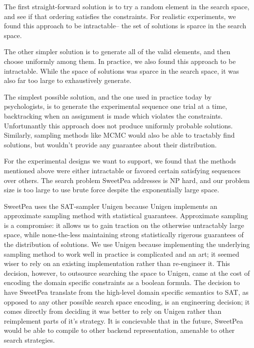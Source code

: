 The first straight-forward solution is to try a random element in the search space, and see if that ordering satisfies the constraints. For realistic experiments, we found this approach to be intractable-- the set of solutions is sparce in the search space.

The other simpler solution is to generate all of the valid elements, and then choose uniformly among them. In practice, we also found this approach to be intractable. While the space of solutions was sparce in the search space, it was also far too large to exhaustively generate.

The simplest possible solution, and the one used in practice today by psychologists, is to generate the experimental sequence one trial at a time, backtracking when an assignment is made which violates the constraints. Unfortunantly this approach does not produce uniformly probable solutions. Similarly, sampling methods like MCMC would also be able to tractably find solutions, but wouldn't provide any guarantee about their distribution.

For the experimental designs we want to support, we found that the methods mentioned above were either intractable or favored certain satisfying sequences over others. The search problem SweetPea addresses is NP hard, and our problem size is too large to use brute force despite the exponentially large space.

SweetPea uses the SAT-sampler Unigen because Unigen implements an approximate sampling method with statistical guarantees. Approximate sampling is a compromise: it allows us to gain traction on the otherwise untractably large space, while none-the-less maintaining strong statistically rigerous guarantees of the distribution of solutions. We use Unigen because implementing the underlying sampling method to work well in practice is complicated and an art; it seemed wiser to rely on an existing implementation rather than re-engineer it. This decision, however, to outsource searching the space to Unigen, came at the cost of encoding the domain specific constraints as a boolean formula. The decision to have SweetPea translate from the high-level domain specific semantics to SAT, as opposed to any other possible search space encoding, is an engineering decision; it comes directly from deciding it was better to rely on Unigen rather than reimplement parts of it's strategy. It is concievable that in the future, SweetPea would be able to compile to other backend representation, amenable to other search strategies.


